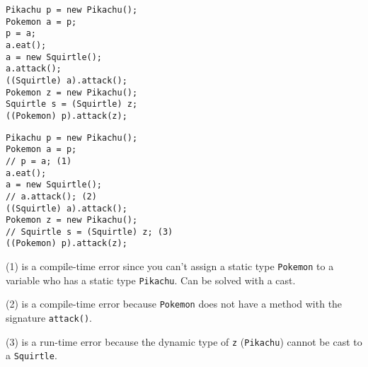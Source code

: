 \ifprintanswers\else
\begin{lstlisting}
Pikachu p = new Pikachu();
Pokemon a = p;
p = a;
a.eat();
a = new Squirtle();
a.attack();
((Squirtle) a).attack();
Pokemon z = new Pikachu();
Squirtle s = (Squirtle) z;
((Pokemon) p).attack(z);
\end{lstlisting}
\fi

\begin{solution}
\begin{lstlisting}
Pikachu p = new Pikachu();
Pokemon a = p;
// p = a; (1)
a.eat();
a = new Squirtle();
// a.attack(); (2)
((Squirtle) a).attack();
Pokemon z = new Pikachu();
// Squirtle s = (Squirtle) z; (3)
((Pokemon) p).attack(z);
\end{lstlisting}

(1) is a compile-time error since you can't assign a static type
\lstinline$Pokemon$ to a variable who has a static type \lstinline$Pikachu$.
Can be solved with a cast.

(2) is a compile-time error because \lstinline$Pokemon$ does not have a method
with the signature \lstinline$attack()$.

(3) is a run-time error because the dynamic type of \lstinline$z$
(\lstinline$Pikachu$) cannot be cast to a \lstinline$Squirtle$.
\end{solution}
